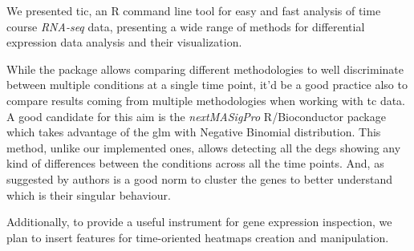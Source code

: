 We presented \gls{tic}, an R command line tool for easy and fast analysis of time course \textit{RNA-seq} data, presenting a wide range of methods for differential expression data analysis and their visualization.

While the package allows comparing different methodologies to well discriminate between multiple conditions at a single time point, it'd be a good practice also to compare results coming from multiple methodologies when working with \gls{tc} data.
A good candidate for this aim is the \textit{nextMASigPro} R/Bioconductor package which takes advantage of the \gls{glm} with Negative Binomial distribution.
This method, unlike our implemented ones, allows detecting all the \glspl{deg} showing any kind of differences between the conditions across all the time points.
And, as suggested by authors is a good norm to cluster the genes to better understand which is their singular behaviour.

Additionally, to provide a useful instrument for gene expression inspection, we plan to insert features for time-oriented heatmaps creation and manipulation.

